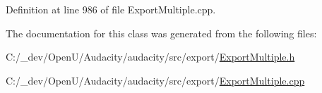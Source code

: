 Definition at line 986 of file Export\+Multiple.\+cpp.



The documentation for this class was generated from the following files\+:\begin{DoxyCompactItemize}
\item 
C\+:/\+\_\+dev/\+Open\+U/\+Audacity/audacity/src/export/\hyperlink{_export_multiple_8h}{Export\+Multiple.\+h}\item 
C\+:/\+\_\+dev/\+Open\+U/\+Audacity/audacity/src/export/\hyperlink{_export_multiple_8cpp}{Export\+Multiple.\+cpp}\end{DoxyCompactItemize}

